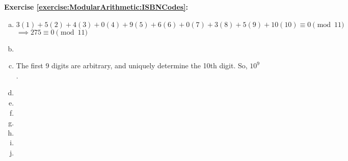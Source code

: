 \noindent\textbf{Exercise \ref{exercise:ModularArithmetic:ISBNCodes}:}
\begin{enumerate}[(a)]
\item
$3(1)+5(2)+4(3)+0(4)+9(5)+6(6)+0(7)+3(8)+5(9)+10(10) \equiv 0 \pmod{11}$\\
$\implies 275 \equiv 0 \pmod{11}$

\item
 
 \item
The first 9 digits are arbitrary, and uniquely determine the 10th digit. So, $10^9$.

\item

\item

\item
  
 \item
 
 \item

\item

\item

\end{enumerate}

